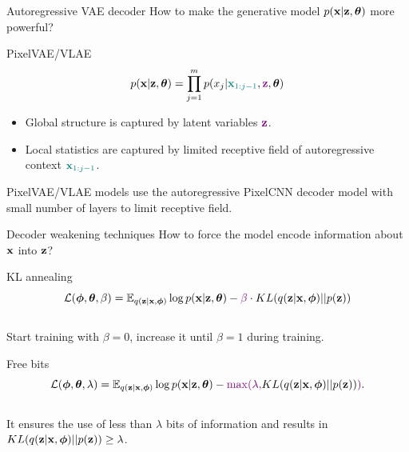 \documentclass{beamer}
\begin{document}
\begin{frame}{Autoregressive VAE decoder}
	How to make the generative model $p(\mathbf{x} | \mathbf{z}, \boldsymbol{\theta})$ more powerful?
	\begin{block}{PixelVAE/VLAE}
		\vspace{-0.3cm}
		\[
			p(\mathbf{x} | \mathbf{z} , \boldsymbol{\theta}) = \prod_{j=1}^m p(x_j | {\color{teal}\mathbf{x}_{1:j - 1}}, {\color{violet}\mathbf{z}}, \boldsymbol{\theta})
		\]
		\begin{itemize}
			\item Global structure is captured by latent variables ${\color{violet}\mathbf{z}}$.
			\item Local statistics are captured by limited receptive field of autoregressive context ${\color{teal}\mathbf{x}_{1:j - 1}}$.
		\end{itemize}
	\end{block}
	PixelVAE/VLAE models use the autoregressive PixelCNN decoder model with small number of layers to limit receptive field.
\end{frame}
\begin{frame}{Decoder weakening techniques}
	How to force the model encode information about $\mathbf{x}$ into $\mathbf{z}$?
	\begin{block}{KL annealing}
		\vspace{-0.3cm}
		\[
		    \mathcal{L}(\boldsymbol{\phi}, \boldsymbol{\theta}, \beta) = \mathbb{E}_{q(\mathbf{z} | \mathbf{x}, \boldsymbol{\phi})} \log p(\mathbf{x} | \mathbf{z}, \boldsymbol{\theta}) - {\color{violet}\beta} \cdot KL (q(\mathbf{z} | \mathbf{x}, \boldsymbol{\phi}) || p(\mathbf{z}))
		\]
		\vspace{-0.3cm} \\
		Start training with $\beta = 0$, increase it until $\beta = 1$ during training.
	\end{block}
	\begin{block}{Free bits}
		\vspace{-0.3cm}
		\[
		    \mathcal{L}(\boldsymbol{\phi}, \boldsymbol{\theta}, \lambda) = \mathbb{E}_{q(\mathbf{z} | \mathbf{x}, \boldsymbol{\phi})} \log p(\mathbf{x} | \mathbf{z}, \boldsymbol{\theta}) - {\color{violet}\max(\lambda,} KL (q(\mathbf{z} | \mathbf{x}, \boldsymbol{\phi}) || p(\mathbf{z})){\color{violet})}.
		\]
		\vspace{-0.3cm} \\
		It ensures the use of less than $\lambda$ bits of information and results in $KL (q(\mathbf{z} | \mathbf{x}, \boldsymbol{\phi}) || p(\mathbf{z})) \geq \lambda$.
	\end{block}
\end{frame}
\end{document}
